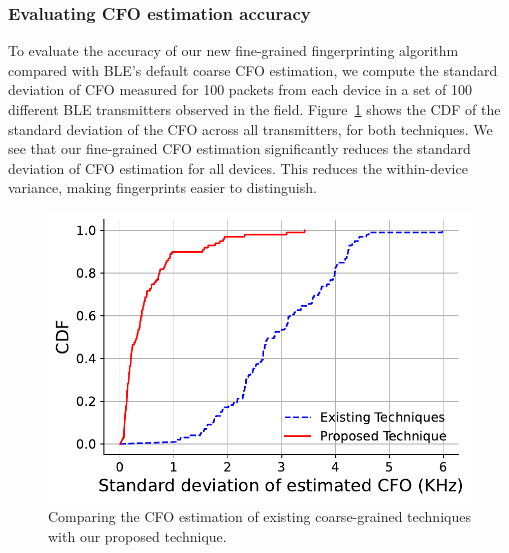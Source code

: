 %
\subsubsection*{Evaluating CFO estimation accuracy}
To evaluate the accuracy of our new fine-grained fingerprinting algorithm compared with BLE’s default coarse
CFO estimation, 
we compute the standard deviation of CFO measured for 100 packets from each device in a set of 100 different BLE transmitters observed in the field. %
%
 Figure~\ref{fig:cfo_comp} shows the CDF of the standard deviation of the CFO across all transmitters, for both techniques.
%
We see that 
our fine-grained CFO estimation significantly reduces the standard deviation of CFO estimation for all devices. This reduces the within-device variance, making fingerprints easier to distinguish.
%

\begin{figure}
    \centering
    \includegraphics[width = \linewidth]{bletracking/plots/CFO_comparison_ESP2.pdf} 
    \caption{Comparing the CFO estimation of existing coarse-grained techniques with our proposed technique.}
    \label{fig:cfo_comp}
\end{figure}


